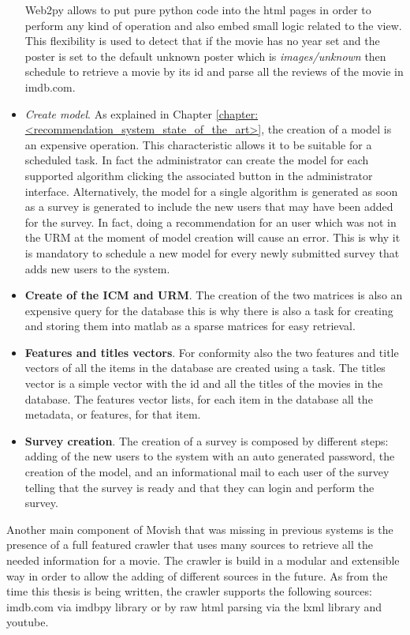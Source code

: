 \begin{itemize}
Web2py allows to put pure python code into the \ac{html} pages in order to perform any kind of operation and also embed small logic related to the view. This flexibility is used to detect that if the movie has no year set and the poster is set to the default unknown poster which is \textit{images/unknown} then schedule to retrieve a movie by its id and parse all the reviews of the movie in imdb.com.
\item \textit{Create model}. As explained in Chapter \ref{chapter:<recommendation_system_state_of_the_art>}, the creation of a model is an expensive operation. This characteristic allows it to be suitable for a scheduled task. In fact the administrator can create the model for each supported algorithm clicking the associated button in the administrator interface. Alternatively, the model for a single algorithm is generated as soon as a survey is generated to include the new users that may have been added for the survey.
In fact, doing a recommendation for an user which was not in the \ac{URM} at the moment of model creation will cause an error. This is why it is mandatory to schedule a new model for every newly submitted survey that adds new users to the system.
\item \textbf{Create of the \ac{ICM} and \ac{URM}}. The creation of the two matrices is also an expensive query for the database this is why there is also a task for creating and storing them into matlab as a sparse matrices for easy retrieval.
\item \textbf{Features and titles vectors}. For conformity also the two features and title vectors of all the items in the database are created using a task. The titles vector is a simple vector with the id and all the titles of the movies in the database. The features vector lists, for each item in the database all the metadata, or features, for that item.
\item \textbf{Survey creation}. The creation of a survey is composed by different steps: adding of the new users to the system with an auto generated password, the creation of the model, and an informational mail to each user of the survey telling that the survey is ready and that they can login and perform the survey.
\end{itemize}

Another main component of Movish that was missing in previous systems is the presence of a full featured crawler that uses many sources to retrieve all the needed information for a movie. The crawler is build in a modular and extensible way in order to allow the adding of different sources in the future. As from the time this thesis is being written, the crawler supports the following sources: imdb.com \cite{imdb} via imdbpy \cite{imdbpy} library or by raw \ac{html} parsing via the lxml \cite{lxml} library and youtube. 

